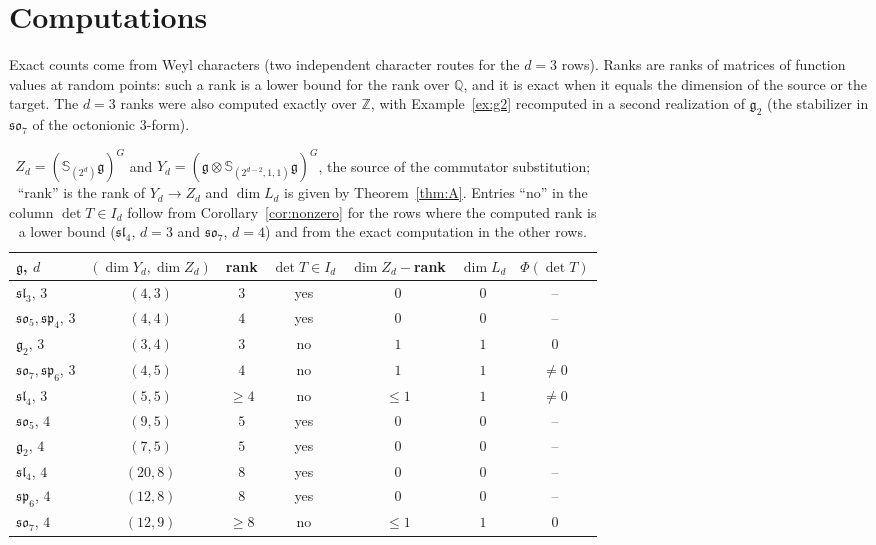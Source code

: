 \documentclass[11pt]{article}
\theoremstyle{definition}
\newcommand{\g}{\mathfrak g}
\newcommand{\Sf}{\mathbb S}
\begin{document}
\appendix
\section{Computations}\label{app:comp}

Exact counts come from Weyl characters (two independent character routes for the $d=3$ rows). Ranks are ranks of matrices of function values at random points: such a rank is a lower bound for the rank over $\mathbb Q$, and it is exact when it equals the dimension of the source or the target. The $d=3$ ranks were also computed exactly over $\mathbb Z$, with Example~\ref{ex:g2} recomputed in a second realization of $\g_2$ (the stabilizer in $\mathfrak{so}_7$ of the octonionic $3$-form).

\begin{table}[ht]
\centering\small
\setlength{\tabcolsep}{4pt}
\begin{tabular}{lcccccc}
\toprule
$\g$, $d$ & $(\dim Y_d,\dim Z_d)$ & rank & $\det T\in I_d$ & $\dim Z_d-$rank & $\dim L_d$ & $\Phi(\det T)$\\
\midrule
$\mathfrak{sl}_3$, $3$ & $(4,3)$ & $3$ & yes & $0$ & $0$ & --\\
$\mathfrak{so}_5,\mathfrak{sp}_4$, $3$ & $(4,4)$ & $4$ & yes & $0$ & $0$ & --\\
$\g_2$, $3$ & $(3,4)$ & $3$ & no & $1$ & $1$ & $0$\\
$\mathfrak{so}_7,\mathfrak{sp}_6$, $3$ & $(4,5)$ & $4$ & no & $1$ & $1$ & $\neq0$\\
$\mathfrak{sl}_4$, $3$ & $(5,5)$ & $\ge4$ & no & $\le1$ & $1$ & $\neq0$\\
$\mathfrak{so}_5$, $4$ & $(9,5)$ & $5$ & yes & $0$ & $0$ & --\\
$\g_2$, $4$ & $(7,5)$ & $5$ & yes & $0$ & $0$ & --\\
$\mathfrak{sl}_4$, $4$ & $(20,8)$ & $8$ & yes & $0$ & $0$ & --\\
$\mathfrak{sp}_6$, $4$ & $(12,8)$ & $8$ & yes & $0$ & $0$ & --\\
$\mathfrak{so}_7$, $4$ & $(12,9)$ & $\ge8$ & no & $\le1$ & $1$ & $0$\\
\bottomrule
\end{tabular}
\caption{$Z_d=(\Sf_{(2^d)}\g)^G$ and $Y_d=(\g\otimes\Sf_{(2^{d-2},1,1)}\g)^G$, the source of the commutator substitution; ``rank'' is the rank of $Y_d\to Z_d$ and $\dim L_d$ is given by Theorem~\ref{thm:A}. Entries ``no'' in the column $\det T\in I_d$ follow from Corollary~\ref{cor:nonzero} for the rows where the computed rank is a lower bound ($\mathfrak{sl}_4$, $d=3$ and $\mathfrak{so}_7$, $d=4$) and from the exact computation in the other rows.}\label{tab:comp}
\end{table}
\end{document}
